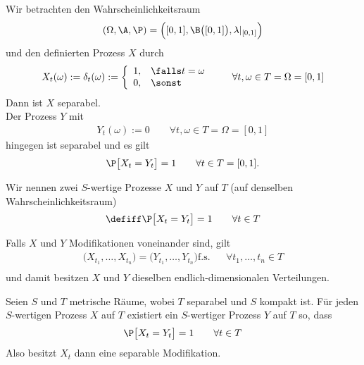 \begin{aufgabenr}\label{aufg:15}\enter
	Wir betrachten den Wahrscheinlichkeitsraum
	\begin{align*}
		(\Omega,\A,\P)=\Big([0,1],\B\big([0,1]\big),\lambda|_{[0,1]}\Big)
	\end{align*}
	und den definierten Prozess $X$ durch
	\begin{align*}
		X_t(\omega):=\delta_t(\omega):=\left\lbrace\begin{array}{cl}
			1, &\falls t=\omega\\
			0, &\sonst
		\end{array}\right.
		\qquad\forall t,\omega\in T=\Omega=[0,1]
	\end{align*}
	Dann ist $X$  separabel.\\
	Der Prozess $Y$ mit
	\begin{align*}
		Y_t(\omega):=0\qquad\forall t,\omega\in T=\Omega=[0,1]
	\end{align*}
	hingegen ist separabel und es gilt
	\begin{align*}
		\P\big[X_t=Y_t\big]=1\qquad\forall t\in T=[0,1].
	\end{align*}
\end{aufgabenr}

\setcounter{satz}{5}

\begin{definition}\label{def2.1.6}
	Wir nennen zwei $S$-wertige Prozesse $X$ und $Y$ auf $T$ (auf denselben Wahrscheinlichkeitsraum) 
	\begin{align*}
		\defiff \P\big[X_t=Y_t\big]=1\qquad\forall t\in T
	\end{align*}
\end{definition}

\begin{bemerkung} %
	Falls $X$ und $Y$ Modifikationen voneinander sind, gilt
	\begin{align*}
		\Big(X_{t_1},\ldots,X_{t_n}\Big)=\Big(Y_{t_1},\ldots,Y_{t_n}\Big)\text{f.s.} &&\forall t_1,\ldots,t_n\in T\\
	\end{align*}
	und damit besitzen $X$ und $Y$ dieselben endlich-dimensionalen Verteilungen.
\end{bemerkung}

\begin{satz}\label{satz2.1.7}
	Seien $S$ und $T$ metrische Räume, wobei $T$ separabel und $S$ kompakt ist.
	Für jeden $S$-wertigen Prozess $X$ auf $T$ existiert ein  $S$-wertiger Prozess $Y$ auf $T$ so, dass 
	\begin{align*}
		\P\big[X_t=Y_t\big]=1\qquad\forall t\in T
	\end{align*}
	Also besitzt $X_t$ dann eine separable Modifikation.
\end{satz}

